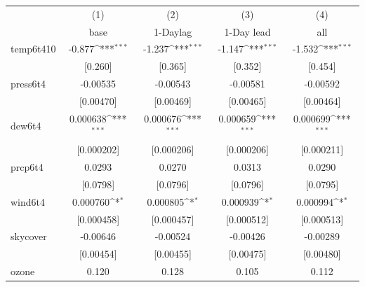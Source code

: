 \documentclass[11pt]{article}
\begin{document}
\begin{subappendices}
		\newpage
		\begin{center}
			 \label{tab:title} 
			{
				{
					\def\sym#1{\ifmmode^{#1}\else\(^{#1}\)\fi}
					\begin{tabular}{l*{4}{c}}
						\hline\hline
						&\multicolumn{1}{c}{(1)}&\multicolumn{1}{c}{(2)}&\multicolumn{1}{c}{(3)}&\multicolumn{1}{c}{(4)}\\
						&\multicolumn{1}{c}{base}&\multicolumn{1}{c}{1-Daylag}&\multicolumn{1}{c}{1-Day lead}&\multicolumn{1}{c}{all}\\
						\hline
						temp6t410   &      -0.877\sym{***}&      -1.237\sym{***}&      -1.147\sym{***}&      -1.532\sym{***}\\
						&     [0.260]         &     [0.365]         &     [0.352]         &     [0.454]         \\
						[1em]
						press6t4    &    -0.00535         &    -0.00543         &    -0.00581         &    -0.00592         \\
						&   [0.00470]         &   [0.00469]         &   [0.00465]         &   [0.00464]         \\
						[1em]
						dew6t4      &    0.000638\sym{***}&    0.000676\sym{***}&    0.000659\sym{***}&    0.000699\sym{***}\\
						&  [0.000202]         &  [0.000206]         &  [0.000206]         &  [0.000211]         \\
						[1em]
						prcp6t4     &      0.0293         &      0.0270         &      0.0313         &      0.0290         \\
						&    [0.0798]         &    [0.0796]         &    [0.0796]         &    [0.0795]         \\
						[1em]
						wind6t4     &    0.000760\sym{*}  &    0.000805\sym{*}  &    0.000939\sym{*}  &    0.000994\sym{*}  \\
						&  [0.000458]         &  [0.000457]         &  [0.000512]         &  [0.000513]         \\
						[1em]
						skycover    &    -0.00646         &    -0.00524         &    -0.00426         &    -0.00289         \\
						&   [0.00454]         &   [0.00455]         &   [0.00475]         &   [0.00480]         \\
						[1em]
						ozone       &       0.120         &       0.128         &       0.105         &       0.112         \\

\end{tabular}}}
\end{center}
\end{subappendices}
\end{document}
